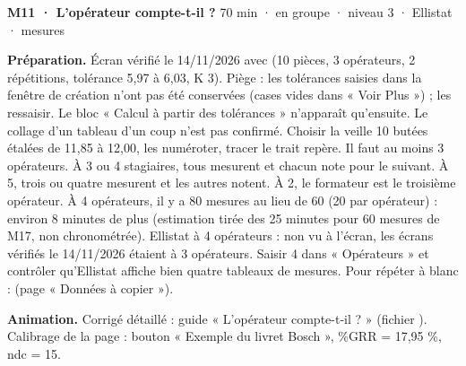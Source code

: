 \begin{tcolorbox}[act]\textbf{M11 · L'opérateur compte-t-il ?} \hfill {\small 70 min · en groupe · niveau 3 · Ellistat · mesures}\end{tcolorbox}
\textbf{Préparation.} Écran vérifié le 14/11/2026 avec  (10 pièces, 3 opérateurs, 2 répétitions, tolérance 5,97 à 6,03, K 3). Piège : les tolérances saisies dans la fenêtre de création n'ont pas été conservées (cases vides dans « Voir Plus ») ; les ressaisir. Le bloc « Calcul à partir des tolérances » n'apparaît qu'ensuite. Le collage d'un tableau d'un coup n'est pas confirmé. Choisir la veille 10 butées étalées de 11,85 à 12,00, les numéroter, tracer le trait repère. Il faut au moins 3 opérateurs. À 3 ou 4 stagiaires, tous mesurent et chacun note pour le suivant. À 5, trois ou quatre mesurent et les autres notent. À 2, le formateur est le troisième opérateur. À 4 opérateurs, il y a 80 mesures au lieu de 60 (20 par opérateur) : environ 8 minutes de plus (estimation tirée des 25 minutes pour 60 mesures de M17, non chronométrée). Ellistat à 4 opérateurs : non vu à l'écran, les écrans vérifiés le 14/11/2026 étaient à 3 opérateurs. Saisir 4 dans « Opérateurs » et contrôler qu'Ellistat affiche bien quatre tableaux de mesures. Pour répéter à blanc :  (page « Données à copier »).\par
\textbf{Animation.} Corrigé détaillé : guide « L'opérateur compte-t-il ? » (fichier ). Calibrage de la page : bouton « Exemple du livret Bosch », \%GRR = 17,95 \%, ndc = 15.\par
